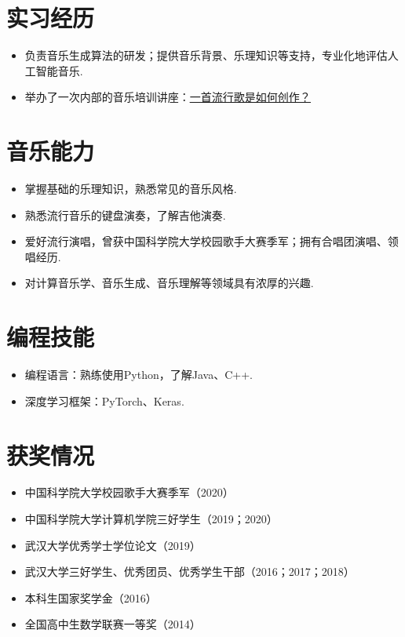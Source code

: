 \documentclass{resume}
\begin{document}
\section{实习经历}
{\small {}
}
\small
\begin{itemize}
  \item 负责音乐生成算法的研发；提供音乐背景、乐理知识等支持，专业化地评估人工智能音乐.
  \item 举办了一次内部的音乐培训讲座：\href{https://www.zhangxueyao.com/data/wcpr-pop-music.pdf}{\underline{一首流行歌是如何创作？}}
\end{itemize}

\section{音乐能力}
\small
\begin{itemize}
  \item 掌握基础的乐理知识，熟悉常见的音乐风格.
  \item 熟悉流行音乐的键盘演奏，了解吉他演奏.
  \item 爱好流行演唱，曾获中国科学院大学校园歌手大赛季军；拥有合唱团演唱、领唱经历.
  \item 对计算音乐学、音乐生成、音乐理解等领域具有浓厚的兴趣. 
\end{itemize}

\section{编程技能}
\small
\begin{itemize}
  \item 编程语言：熟练使用Python，了解Java、C++.
  \item 深度学习框架：PyTorch、Keras.
\end{itemize}

\section{获奖情况}
\begin{itemize}
  \item 中国科学院大学校园歌手大赛季军（2020）
  \item 中国科学院大学计算机学院三好学生（2019；2020）
  \item 武汉大学优秀学士学位论文（2019）
  \item 武汉大学三好学生、优秀团员、优秀学生干部（2016；2017；2018）
  \item 本科生国家奖学金（2016）
  \item 全国高中生数学联赛一等奖（2014）
\end{itemize}
\end{document}
